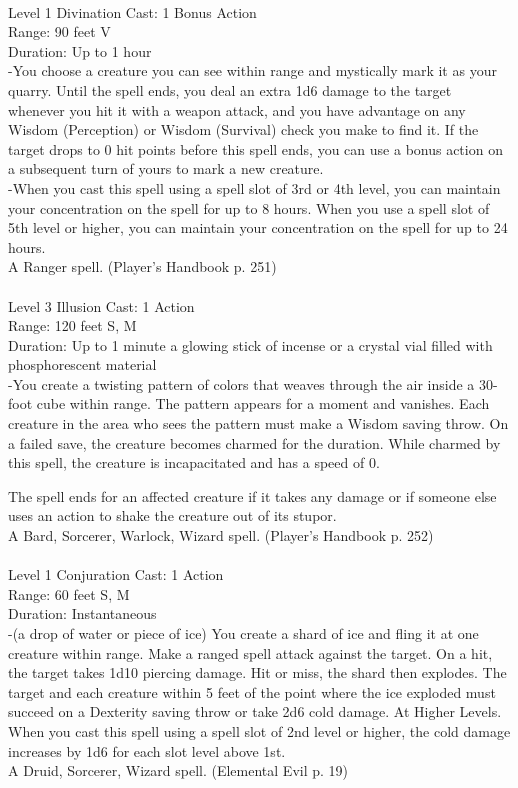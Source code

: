 \documentclass[10pt,twocolumn]{report}
\begin{document}
 \\
Level 1 \quad Divination \quad Cast: 1 Bonus Action\\
Range: 90 feet \quad V\\
Duration: Up to 1 hour \quad \\
-You choose a creature you can see within range and mystically mark it as your quarry.
Until the spell ends, you deal an extra 1d6 damage to the target whenever you hit it with a weapon attack, and you have advantage on any Wisdom (Perception) or Wisdom (Survival) check you make to find it. If the target drops to 0 hit points before this spell ends, you can use a bonus action on a subsequent turn of yours to mark a new creature.\\
-When you cast this spell using a spell slot of 3rd or 4th level, you can maintain your concentration on the spell for up to 8 hours.
When you use a spell slot of 5th level or higher, you can maintain your concentration on the spell for up to 24 hours.\\
A Ranger spell. (Player's Handbook p. 251) \\


 \\
Level 3 \quad Illusion \quad Cast: 1 Action\\
Range: 120 feet \quad S, M\\
Duration: Up to 1 minute \quad a glowing stick of incense or a crystal vial filled with phosphorescent material\\
-You create a twisting pattern of colors that weaves through the air inside a 30-foot cube within range.
The pattern appears for a moment and vanishes. Each creature in the area who sees the pattern must make a Wisdom saving throw. On a failed save, the creature becomes charmed for the duration. While charmed by this spell, the creature is incapacitated and has a speed of 0.

The spell ends for an affected creature if it takes any damage or if someone else uses an action to shake the creature out of its stupor.\\
A Bard, Sorcerer, Warlock, Wizard spell. (Player's Handbook p. 252) \\


 \\
Level 1 \quad Conjuration \quad Cast: 1 Action\\
Range: 60 feet \quad S, M\\
Duration: Instantaneous \quad \\
-(a drop of water or piece of ice)
You create a shard of ice and fling it at one creature within range. Make a ranged spell attack against the target. On a hit, the target takes 1d10 piercing damage. Hit or miss, the shard then explodes. The target and each creature within 5 feet of the point where the ice exploded must succeed on a Dexterity saving throw or take 2d6 cold damage.
At Higher Levels. When you cast this spell using a spell slot of 2nd level or higher, the cold damage increases by 1d6 for each slot level above 1st.\\
A Druid, Sorcerer, Wizard spell. (Elemental Evil p. 19) \\
\end{document}
